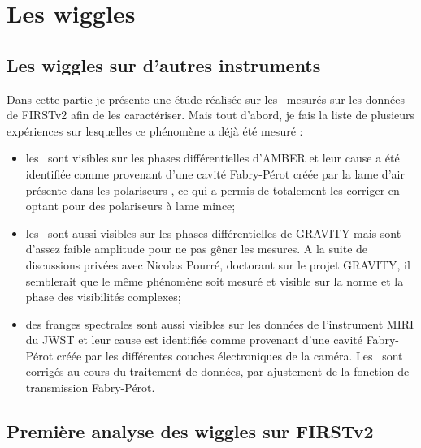 \begin{figure}[ht!]
    \label{fig:PhaseDiffBin02LikeliMap}
\end{figure}


\section{Les wiggles}
\label{sec:wiggles}

\subsection{Les wiggles sur d'autres instruments}

Dans cette partie je présente une étude réalisée sur les \wiggles~mesurés sur les données de \ac{FIRSTv2} afin de les caractériser. Mais tout d'abord, je fais la liste de plusieurs expériences sur lesquelles ce phénomène a déjà été mesuré :

\begin{itemize}
    \item les \wiggles~sont visibles sur les phases différentielles d'\ac{AMBER} \citep{millour2008} et leur cause a été identifiée comme provenant d'une cavité Fabry-Pérot créée par la lame d'air présente dans les polariseurs \citep{malbet2008}, ce qui a permis de totalement les corriger en optant pour des polariseurs à lame mince;
    \item les \wiggles~sont aussi visibles sur les phases différentielles de \ac{GRAVITY} \citep{amorim2020} mais sont d'assez faible amplitude pour ne pas gêner les mesures. A la suite de discussions privées avec Nicolas Pourré, doctorant sur le projet \ac{GRAVITY}, il semblerait que le même phénomène soit mesuré et visible sur la norme et la phase des visibilités complexes;
    \item des franges spectrales sont aussi visibles sur les données de l'instrument \ac{MIRI} du \ac{JWST} \citep{argyriou2020} et leur cause est identifiée comme provenant d'une cavité Fabry-Pérot créée par les différentes couches électroniques de la caméra. Les \wiggles~sont corrigés au cours du traitement de données, par ajustement de la fonction de transmission Fabry-Pérot.
\end{itemize}


\subsection{Première analyse des wiggles sur FIRSTv2}

